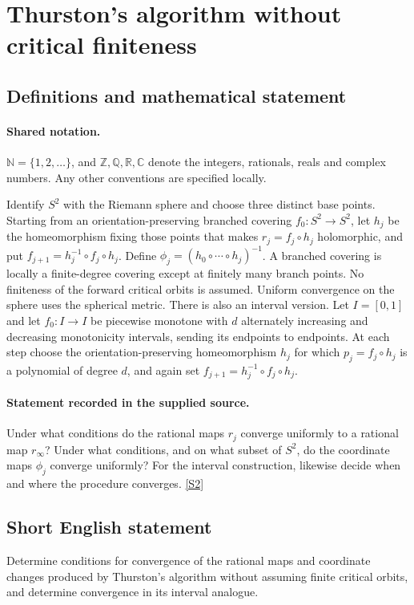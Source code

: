 \documentclass[11pt]{article}
\newcommand{\sref}[2]{\hyperlink{source:#1:#2}{[S#2]}}
\begin{document}
\section{Thurston's algorithm without critical finiteness}\label{statement}

\subsection{Definitions and mathematical statement}

\paragraph{Shared notation.}$\mathbb N=\{1,2,\ldots\}$, and $\mathbb Z,\mathbb Q,\mathbb R,\mathbb C$ denote the integers, rationals, reals and complex numbers. Any other conventions are specified locally.


Identify $S^2$ with the Riemann sphere and choose three distinct base points. Starting from an orientation-preserving branched covering $f_0:S^2\to S^2$, let $h_j$ be the homeomorphism fixing those points that makes $r_j=f_j\circ h_j$ holomorphic, and put $f_{j+1}=h_j^{-1}\circ f_j\circ h_j$. Define $\phi_j=(h_0\circ\cdots\circ h_j)^{-1}$. A branched covering is locally a finite-degree covering except at finitely many branch points. No finiteness of the forward critical orbits is assumed. Uniform convergence on the sphere uses the spherical metric.
There is also an interval version. Let $I=[0,1]$ and let $f_0:I\to I$ be piecewise monotone with $d$ alternately increasing and decreasing monotonicity intervals, sending its endpoints to endpoints. At each step choose the orientation-preserving homeomorphism $h_j$ for which $p_j=f_j\circ h_j$ is a polynomial of degree $d$, and again set $f_{j+1}=h_j^{-1}\circ f_j\circ h_j$.
\paragraph{Statement recorded in the supplied source.}
Under what conditions do the rational maps $r_j$ converge uniformly to a rational map $r_\infty$? Under what conditions, and on what subset of $S^2$, do the coordinate maps $\phi_j$ converge uniformly? For the interval construction, likewise decide when and where the procedure converges. \sref{statement}{2}
\subsection{Short English statement}
Determine conditions for convergence of the rational maps and coordinate changes produced by Thurston’s algorithm without assuming finite critical orbits, and determine convergence in its interval analogue.
\end{document}
